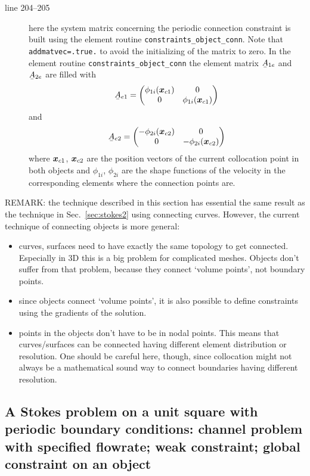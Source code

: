 \begin{description}
   \item[line 204--205] here the system matrix concerning the periodic
     connection constraint is built using the element routine
     \texttt{constraints\_object\_conn}. Note that \texttt{addmatvec=.true.} to
     avoid the initializing of the matrix to zero. In the element routine
     \texttt{constraints\_object\_conn} the element
      matrix $\mat A_{1e}$ and  $\mat A_{2e}$ are filled with
     \[
   \mat A_{e1}=
          \begin{pmatrix}
             \phi_{1i}(\vek x_{c1}) & 0 \\
             0 & \phi_{1i}(\vek x_{c1})
          \end{pmatrix}
     \]
and 
     \[
   \mat A_{e2}=
          \begin{pmatrix}
             -\phi_{2i}(\vek x_{c2}) & 0 \\
             0 & -\phi_{2i}(\vek x_{c2})
          \end{pmatrix}
     \]
where $\boldsymbol{x}_{c1}$, $\boldsymbol{x}_{c2}$ are the
position vectors of the current collocation point in both objects and 
 $\phi_{1i}$, $\phi_{2i}$ are the shape functions of the velocity in
the corresponding elements where the connection points are.
\end{description}

REMARK: the technique described in this section has essential the same result
as the technique in Sec.~\ref{sec:stokes2} using connecting curves. However,
the current technique of connecting objects is more general:
\begin{itemize}
   \item curves, surfaces need to have exactly the same topology to get
connected. Especially in 3D this is a big problem for complicated meshes.
Objects don't suffer from that problem, because they connect
`volume points', not boundary points.
   \item since objects connect `volume points', it is also possible to define
constraints using the gradients of the solution.
   \item points in the objects don't have to be in nodal points. This means
that curves/surfaces can be connected having different element distribution or
resolution. One should be careful here, though, since collocation might not
always be a mathematical sound way to connect boundaries having different
resolution. 
\end{itemize}

\subsection{A Stokes problem on a unit square with periodic boundary
         conditions: channel problem with specified flowrate; weak constraint;
         global constraint on an object}

